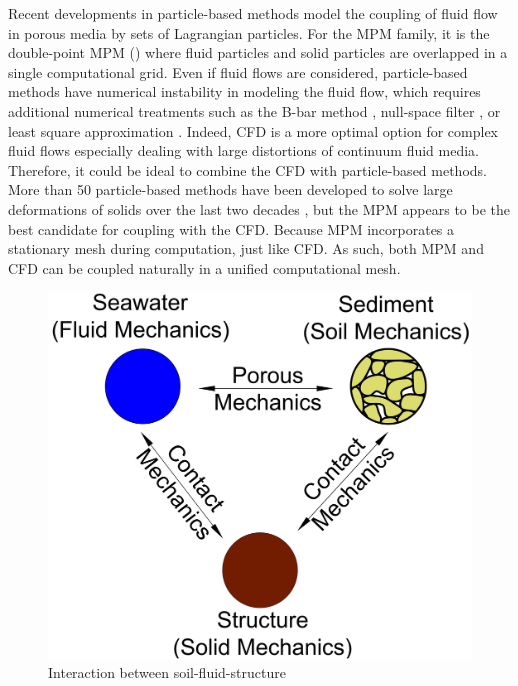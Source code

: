 \documentclass[preprint,12pt]{elsarticle}
\begin{document}
Recent developments in particle-based methods model the coupling of fluid flow in porous media by sets of Lagrangian particles. For the MPM family, it is the double-point MPM (\cite{Bandara2015, Tampubolon2017, Baumgarten2019}) where fluid particles and solid particles are overlapped in a single computational grid. Even if fluid flows are considered, particle-based methods have numerical instability in modeling the fluid flow, which requires additional numerical treatments such as the B-bar method \cite{Bandara2015}, null-space filter \cite{nullspace}, or least square approximation \cite{Zheng2021, CPLS}. Indeed, CFD is a more optimal option for complex fluid flows especially dealing with large distortions of continuum fluid media. Therefore, it could be ideal to combine the CFD with particle-based methods. More than 50 particle-based methods have been developed to solve large deformations of solids over the last two decades \cite{Chen2017}, but the MPM appears to be the best candidate for coupling with the CFD. Because MPM incorporates a stationary mesh during computation, just like CFD. As such, both MPM and CFD can be coupled naturally in a unified computational mesh.\\
%
%
\begin{figure}[h]
\center
\includegraphics[scale=.3]{3phases.jpg}
\caption{Interaction between soil-fluid-structure}
\label{fig:3phases}
\end{figure}
%
%
\end{document}
